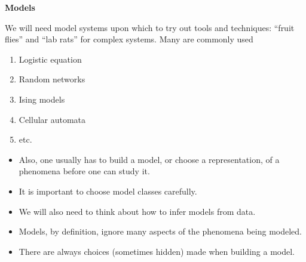 \documentclass[%
  color,
  epsf,
  url,
  amssymb,
  semhelv,%
  portrait,%
  semlayer%
  ]{seminar}
\begin{document}
\begin{slide*}
\centerslidesfalse
\begin{center}
{\bf Models}
\end{center}

We will need model systems upon which to try out tools and
techniques:  ``fruit flies'' and ``lab rats'' for complex systems.
Many are commonly used
\begin{enumerate}
\setlength{\itemsep}{-2mm}
    \item Logistic equation
    \item Random networks
    \item Ising models
    \item Cellular automata
    \item etc.\\
\end{enumerate}

\begin{itemize}

\item Also, one usually has to build a model, or choose a representation, of
a phenomena before one can study it.  

\item It is important to choose model classes carefully.

\item We will also need to think about how to infer models from data.

\item Models, by definition, ignore many aspects of the phenomena
being modeled.

\item There are always choices (sometimes hidden) made when building a
model. 

\end{itemize}

\end{slide*}

\end{document}
